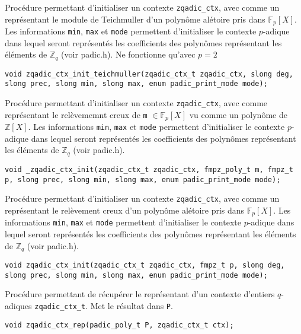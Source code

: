 \documentclass[11pt]{article}
\begin{document}
Procédure permettant d'initialiser un contexte \texttt{zqadic_ctx}, avec comme un représentant le module de Teichmuller d'un polynôme alétoire pris dans $\mathbb{F}_p[X]$. Les informations \texttt{min}, \texttt{max} et \texttt{mode} permettent d'initialiser le contexte $p$-adique dans lequel seront représentés les coefficients des polynômes représentant les éléments de $\mathbb{Z}_q$ (voir padic.h). Ne fonctionne qu'avec $p = 2$
\begin{verbatim}
void zqadic_ctx_init_teichmuller(zqadic_ctx_t zqadic_ctx, slong deg, slong prec, slong min, slong max, enum padic_print_mode mode);
\end{verbatim}

Procédure permettant d'initialiser un contexte \texttt{zqadic_ctx}, avec comme représentant le relèvememnt creux de \texttt{m} $\in \mathbb{F}_p[X]$ vu comme un polynôme de $\mathbb{Z}[X]$. Les informations \texttt{min}, \texttt{max} et \texttt{mode} permettent d'initialiser le contexte $p$-adique dans lequel seront représentés les coefficients des polynômes représentant les éléments de $\mathbb{Z}_q$ (voir padic.h).
\begin{verbatim}
void _zqadic_ctx_init(zqadic_ctx_t zqadic_ctx, fmpz_poly_t m, fmpz_t p, slong prec, slong min, slong max, enum padic_print_mode mode);
\end{verbatim}

Procédure permettant d'initialiser un contexte \texttt{zqadic_ctx}, avec comme un représentant le relèvement creux d'un polynôme alétoire pris dans $\mathbb{F}_p[X]$. Les informations \texttt{min}, \texttt{max} et \texttt{mode} permettent d'initialiser le contexte $p$-adique dans lequel seront représentés les coefficients des polynômes représentant les éléments de $\mathbb{Z}_q$ (voir padic.h).
\begin{verbatim}
void zqadic_ctx_init(zqadic_ctx_t zqadic_ctx, fmpz_t p, slong deg, slong prec, slong min, slong max, enum padic_print_mode mode);
\end{verbatim}

Procédure permettant de récupérer le représentant d'un contexte d'entiers $q$-adiques \texttt{zqadic_ctx_t}. Met le résultat dans \texttt{P}.
\begin{verbatim}
void zqadic_ctx_rep(padic_poly_t P, zqadic_ctx_t ctx);
\end{verbatim}
\end{document}
